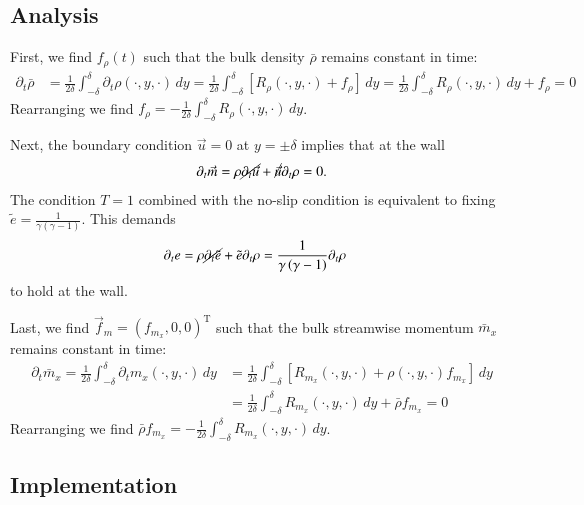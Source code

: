 \documentclass[letterpaper,11pt,nointlimits,reqno]{amsart}
\begin{document}
\subsection*{Analysis}

First, we find $f_{\rho}(t)$ such that the bulk density $\bar{\rho}$
remains constant in time:
\begin{align}
  \partial_{t} \bar{\rho}
  &= \frac{1}{2\delta} \int_{-\delta}^{\delta}
     \partial_{t} \rho\!\left(\cdot,y,\cdot\right) \, dy
   = \frac{1}{2\delta} \int_{-\delta}^{\delta}
     \left[ R_{\rho}\!\left(\cdot,y,\cdot\right) + f_{\rho} \right] \, dy
   = \frac{1}{2\delta} \int_{-\delta}^{\delta}
     R_{\rho}\!\left(\cdot,y,\cdot\right) \, dy + f_{\rho}
   = 0
\end{align}
Rearranging we find $f_{\rho} = - \frac{1}{2\delta} \int_{-\delta}^{\delta}
R_{\rho}\!\left(\cdot,y,\cdot\right) \, dy$.

Next, the boundary condition $\vec{u} = 0$ at $y = \pm\delta$ implies
that at the wall
\begin{align}
  \partial_{t} \vec{m}
  =   \rho \cancel{\partial_{t} \vec{u}}
    + \cancel{\vec{u}} \partial_{t} \rho
  = 0.
\end{align}
The condition $T=1$ combined with the no-slip condition is equivalent to fixing
$\tilde{e}=\frac{1}{\gamma\left(\gamma-1\right)}$.  This demands
\begin{align}
  \partial_{t} e
  &=  \rho \cancel{\partial_{t} \tilde{e}}
    + \tilde{e} \partial_{t} \rho
  = \frac{1}{\gamma\left(\gamma-1\right)} \partial_{t} \rho
\end{align}
to hold at the wall.

Last, we find $\vec{f}_{m} = \left(f_{m_x},0,0\right)^{\textrm{T}}$ such that
the bulk streamwise momentum $\bar{m}_{x}$ remains constant in time:
\begin{align}
  \partial_{t} \bar{m}_x
   = \frac{1}{2\delta} \int_{-\delta}^{\delta}
     \partial_{t} m_{x} \!\left(\cdot,y,\cdot\right) \, dy
  &= \frac{1}{2\delta} \int_{-\delta}^{\delta}
     \left[  R_{m_x}\!\left(\cdot,y,\cdot\right)
           + \rho\!\left(\cdot,y,\cdot\right)  f_{m_x}
     \right] \, dy
  \\
  &= \frac{1}{2\delta} \int_{-\delta}^{\delta}
     R_{m_x}\!\left(\cdot,y,\cdot\right) \, dy + \bar{\rho} f_{m_x}
   = 0
\end{align}
Rearranging we find $\bar{\rho} f_{m_x} = - \frac{1}{2\delta}
\int_{-\delta}^{\delta} R_{m_x}\!\left(\cdot,y,\cdot\right) \, dy$.

\subsection*{Implementation}



\end{document}

